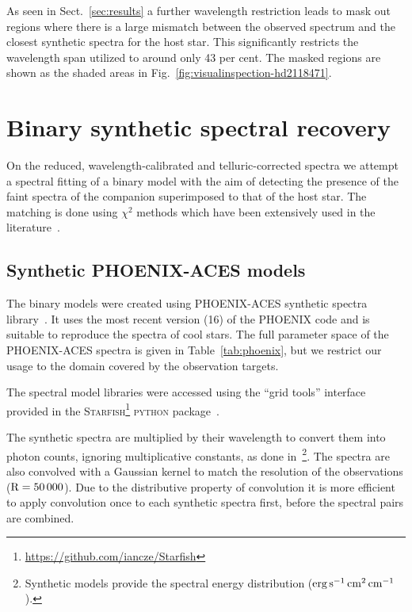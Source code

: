 \documentclass[fleqn,usenatbib]{mnras}
\newcommand*\bl{\color{blue}}
\begin{document}
    As seen in Sect.~\ref{sec:results} a further wavelength restriction leads to mask out regions where there is a large mismatch between the observed spectrum and the closest synthetic spectra for the host star. This significantly restricts the wavelength span utilized to around only 43 per cent. The masked regions are shown as the shaded areas in Fig.~\ref{fig:visualinspection-hd2118471}.
    
    
    \section{Binary synthetic spectral recovery}
    \label{sec:companion_recovery}
    {\bl On the reduced, wavelength-calibrated and telluric-corrected spectra we attempt a spectral fitting of a binary model with the aim of detecting the presence of the faint spectra of the companion superimposed to that of the host star. The matching is done using \(\chi^{2}\) methods which have been extensively used in the literature~\citep[e.g.][]{astudillo-defru_harps_2015, passegger_fundamental_2016, zechmeister_spectrum_2018,nemravova_xtauri_2016}.}
    
    \subsection{Synthetic PHOENIX-ACES models}
    \label{subsec:spec_models}
    The binary models were created using PHOENIX-ACES synthetic spectra library~\citep{husser_new_2013}. It uses the most recent version (16) of the PHOENIX code and is suitable to reproduce the spectra of cool stars. The full parameter space of the PHOENIX-ACES spectra is given in Table~\ref{tab:phoenix}, but we restrict our usage to the domain covered by the observation targets.
    
    
    
    The spectral model libraries were accessed using the ``grid tools'' interface provided in the \textsc{Starfish}\footnote{\url{https://github.com/iancze/Starfish}} \textsc{python} package~\citep{czekala_constructing_2015}.
    
    The synthetic spectra are multiplied by their wavelength to convert them into photon counts, ignoring multiplicative constants, as done in~\citet{figueira_radial_2016}\footnote{Synthetic models provide the spectral energy distribution (\(\rm erg\,s^{-1}\,cm^{2}\,cm^{-1}\)).}. The spectra are also convolved with a Gaussian kernel to match the resolution of the observations (\(\rm R=50\,000\)). Due to the distributive property of convolution it is more efficient to apply convolution once to each synthetic spectra first, before the spectral pairs are combined.
    
\end{document}
